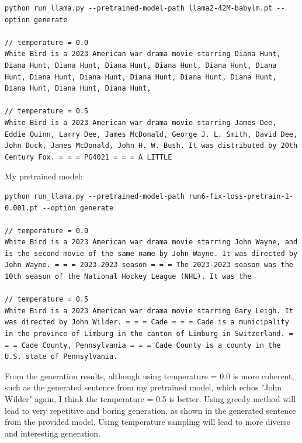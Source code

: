 \documentclass[11pt,a4paper]{article}
\begin{document}
\begin{lstlisting}
python run_llama.py --pretrained-model-path llama2-42M-babylm.pt --option generate

// temperature = 0.0
White Bird is a 2023 American war drama movie starring Diana Hunt, Diana Hunt, Diana Hunt, Diana Hunt, Diana Hunt, Diana Hunt, Diana Hunt, Diana Hunt, Diana Hunt, Diana Hunt, Diana Hunt, Diana Hunt, Diana Hunt, Diana Hunt, Diana Hunt,

// temperature = 0.5
White Bird is a 2023 American war drama movie starring James Dee, Eddie Quinn, Larry Dee, James McDonald, George J. L. Smith, David Dee, John Duck, James McDonald, John H. W. Bush. It was distributed by 20th Century Fox. = = = PG4021 = = = A LITTLE
\end{lstlisting}


My pretrained model:
\begin{lstlisting}
python run_llama.py --pretrained-model-path run6-fix-loss-pretrain-1-0.001.pt --option generate

// temperature = 0.0
White Bird is a 2023 American war drama movie starring John Wayne, and is the second movie of the same name by John Wayne. It was directed by John Wayne. = = = 2023-2023 season = = = The 2023-2023 season was the 10th season of the National Hockey League (NHL). It was the

// temperature = 0.5
White Bird is a 2023 American war drama movie starring Gary Leigh. It was directed by John Wilder. = = = Cade = = = Cade is a municipality in the province of Limburg in the canton of Limburg in Switzerland. = = = Cade County, Pennsylvania = = = Cade County is a county in the U.S. state of Pennsylvania.
\end{lstlisting}


From the generation results, although using temperature = 0.0 is more coherent, such as the generated sentence from my pretrained model, which echos "John Wilder" again, I think the temperature = 0.5 is better. Using greedy method will lead to very repetitive and boring generation, as shown in the generated sentence from the provided model. Using temperature sampling will lead to more diverse and interesting generation.
\end{document}
